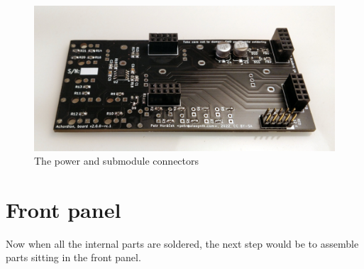 \documentclass[10pt,a4paper,twocolumn]{article}
\begin{document}
\begin{figure}[p]
  \centering
  \includegraphics[width=\linewidth]{p03.jpg}
  \caption{The power and submodule connectors}
  \label{connectors}
\end{figure}

\clearpage

\section{Front panel}

Now when all the internal parts are soldered, the next step would be to assemble parts sitting in the front panel.
\end{document}
